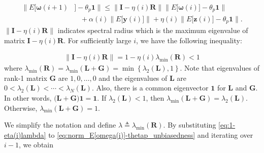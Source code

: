 \documentclass[journal]{IEEEtran}
\begin{document}
\vspace{-4mm}
\small
\begin{align}
\Big\|E\big[\bm{\omega}(i+1)&\big] - {\theta_p}\mathbf{1} \Big\| \le \Big\|\mathbf{I} - \eta(i)\mathbf{R} \Big\|   \Big\|E\big[\bm{\omega}(i)\big] - {\theta_p}\mathbf{1} \Big\|\nonumber \\
&\,\,\,\,\, + \alpha(i) \Big\| E\big[\mathbf{y}(i)\big] \Big\| +\eta(i) \Big\| E\big[\mathbf{z}(i)\big] - \theta_p\mathbf{1}\Big\|. \label{eq:norm_E[omega(i)]-thetap_unbiasedness}
\end{align}
\normalsize
{}{$\big\|\mathbf{I} - \eta(i)\mathbf{R}\big\|$ indicates spectral radius which is the maximum eigenvalue of matrix $\mathbf{I} - \eta(i)\mathbf{R}$. For sufficiently large $i$, we have the following inequality:}

\vspace{-4mm}
\small
\begin{align}{}{
\big\|\mathbf{I} - \eta(i)\mathbf{R}\big\| = 1 - \eta(i)\lambda_{\text{min}}(\mathbf{R}) < 1 \label{eq:1-eta(i)lambda}}
\end{align}
\normalsize
{}{where $\lambda_{\text{min}}(\mathbf{R}) = \lambda_{\text{min}}(\mathbf{L}+\mathbf{G}) = \min \left\{\lambda_2(\mathbf{L}), 1\right\}$.} Note that eigenvalues of rank-1 matrix $\mathbf{G}$ are $1,0,\ldots,0$ and the eigenvalues of $\mathbf{L}$ are $0<\lambda_2(\mathbf{L})<\cdots<\lambda_N(\mathbf{L})$. Also, there is a common eigenvector $\mathbf{1}$ for $\mathbf{L}$ and $\mathbf{G}$. In other words, $\big(\mathbf{L}+\mathbf{G}\big)\mathbf{1} = \mathbf{1}$. If $\lambda_2(\mathbf{L}) < 1$, then $\lambda_{\text{min}}(\mathbf{L}+\mathbf{G}) = \lambda_2(\mathbf{L})$. Otherwise, $\lambda_{\text{min}}(\mathbf{L}+\mathbf{G}) = 1$. 



%
We simplify the notation and define {}{$\lambda \triangleq \lambda_{\text{min}}(\mathbf{R})$}. By substituting \eqref{eq:1-eta(i)lambda} to \eqref{eq:norm_E[omega(i)]-thetap_unbiasedness} and {}{iterating} over $i-1$, we obtain
\end{document}
